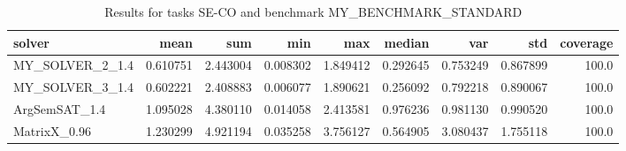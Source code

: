 \begin{table}
\centering
\caption{Results for tasks SE-CO and benchmark MY_BENCHMARK_STANDARD}
\begin{tabular}{lrrrrrrrr}
\toprule
         solver &     mean &      sum &      min &      max &   median &      var &      std &  coverage \\
\midrule
MY\_SOLVER\_2\_1.4 & 0.610751 & 2.443004 & 0.008302 & 1.849412 & 0.292645 & 0.753249 & 0.867899 &     100.0 \\
MY\_SOLVER\_3\_1.4 & 0.602221 & 2.408883 & 0.006077 & 1.890621 & 0.256092 & 0.792218 & 0.890067 &     100.0 \\
  ArgSemSAT\_1.4 & 1.095028 & 4.380110 & 0.014058 & 2.413581 & 0.976236 & 0.981130 & 0.990520 &     100.0 \\
   MatrixX\_0.96 & 1.230299 & 4.921194 & 0.035258 & 3.756127 & 0.564905 & 3.080437 & 1.755118 &     100.0 \\
\bottomrule
\end{tabular}
\end{table}
